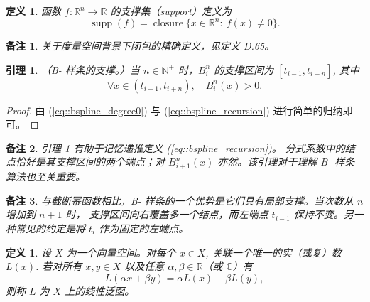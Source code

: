 \documentclass[a4paper]{ctexart}
\newtheorem{remark}{备注}
\newtheorem{definition}[theorem]{定义} %
\newtheorem{lemma}[theorem]{引理}
\numberwithin{theorem}{section}
\numberwithin{equation}{section}
\numberwithin{figure}{section}
\numberwithin{remark}{section}
\begin{document}
\begin{definition}
    \label{def::support_function}
函数 $f:\mathbb{R}^{n}\to\mathbb{R}$ 的支撑集（support）定义为
\begin{equation}
\label{eq::support_def}
\operatorname{supp}(f)=\operatorname{closure}\{x\in\mathbb{R}^{n}:\ f(x)\ne 0\}.
\end{equation}
\end{definition}

\begin{remark}
    \label{rem::closure_precise}
关于度量空间背景下闭包的精确定义，见定义 D.65。
\end{remark}

\begin{lemma}
    \label{lem::support_bspline}
（B- 样条的支撑。）当 $n\in\mathbb{N}^{+}$ 时，$B^{n}_i$ 的支撑区间为 $[t_{i-1},t_{i+n}]$, 其中
\begin{equation}
\label{eq::support_positive}
\forall x\in(t_{i-1},t_{i+n}),\quad B^{n}_i(x)>0.
\end{equation}
\end{lemma}

\begin{proof}
由 (\ref{eq::bspline_degree0}) 与 (\ref{eq::bspline_recursion}) 进行简单的归纳即可。
\end{proof}

\begin{remark}
    \label{rem::memorize_recursion}
引理 \ref{lem::support_bspline} 有助于记忆递推定义 (\ref{eq::bspline_recursion})。
分式系数中的结点恰好是其支撑区间的两个端点；对 $B^{n}_{i+1}(x)$ 亦然。该引理对于理解 B- 样条算法也至关重要。
\end{remark}

\begin{remark}
    \label{rem::local_support_advantage}
与截断幂函数相比，B- 样条的一个优势是它们具有局部支撑。当次数从 $n$ 增加到 $n+1$ 时，
支撑区间向右覆盖多一个结点，而左端点 $t_{i-1}$ 保持不变。另一种常见的约定是将 $t_i$ 作为固定的左端点。
\end{remark}

\begin{definition}
    \label{def::linear_functional}
设 $X$ 为一个向量空间。对每个 $x\in X$, 关联一个唯一的实（或复）数 $L(x)$. 
若对所有 $x,y\in X$ 以及任意 $\alpha,\beta\in\mathbb{R}$（或 $\mathbb{C}$）有
\begin{equation}
\label{eq::linear_functional_axiom}
L(\alpha x+\beta y)=\alpha L(x)+\beta L(y),
\end{equation}
则称 $L$ 为 $X$ 上的线性泛函。
\end{definition}
\end{document}
